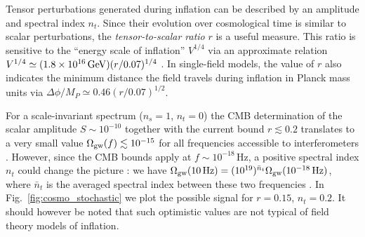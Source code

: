 Tensor perturbations generated during inflation can be described by an amplitude and spectral index $n_t$. Since their evolution over cosmological time is similar to scalar perturbations, the {\em tensor-to-scalar ratio}\/ $r$ is a useful measure. This ratio is sensitive to the ``energy scale of inflation'' $V^{1/4}$ via an approximate relation
$V^{1/4} \simeq (1.8 \times 10^{16}\,{\rm GeV})(r/0.07)^{1/4}$ \cite{Lyth:1996im}. In single-field models, the value of $r$ also indicates the minimum distance the field travels during inflation in Planck mass units via $\Delta \phi/M_{P} \simeq 0.46(r/0.07)^{1/2}$.


For a scale-invariant spectrum ($n_s=1$, $n_t=0$) the CMB determination of the scalar amplitude $S \sim 10^{-10}$ together with the current bound $r\lesssim 0.2$ translates to a very small value $\Omega_{\rm gw}(f)\lesssim 10^{-15}$ for all frequencies accessible to interferometers \cite{Turner:1996ck,Kuroyanagi:2008ye}. However, since the CMB bounds apply at $f\sim 10^{-18}\,$Hz, a positive spectral index $n_t$ could change the picture \cite{Grishchuk:1996ek}: we have $\Omega_{\rm gw}(10\,{\rm Hz}) = (10^{19})^{\bar{n}_t}\Omega_{\rm gw}(10^{-18}\,{\rm Hz})$, where $\bar{n}_t$ is the averaged spectral index between these two frequencies \cite{Boyle:2007zx}. In Fig.~\ref{fig:cosmo_stochastic} we plot the possible signal for $r=0.15$, $n_t=0.2$. It should however be noted that such optimistic values are not typical of field theory models of inflation.



